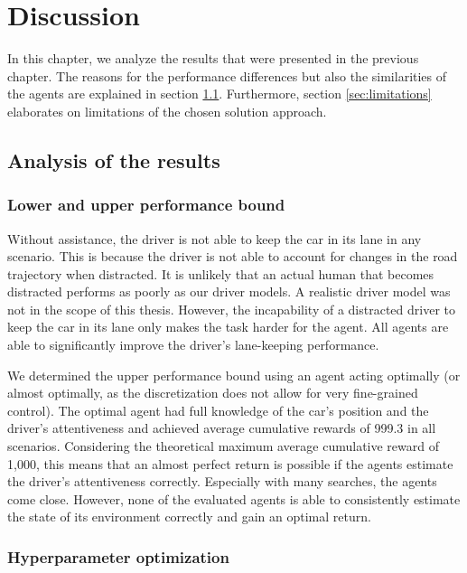 \chapter{Discussion}
\label{ch:discussion}

In this chapter, we analyze the results that were presented in the previous chapter. The reasons for the performance differences but also the similarities of the agents are explained in section \ref{sec:discussion_analysis}. Furthermore, section \ref{sec:limitations} elaborates on limitations of the chosen solution approach.

\section{Analysis of the results}
\label{sec:discussion_analysis}

\subsection{Lower and upper performance bound}

Without assistance, the driver is not able to keep the car in its lane in any scenario. This is because the driver is not able to account for changes in the road trajectory when distracted. It is unlikely that an actual human that becomes distracted performs as poorly as our driver models. A realistic driver model was not in the scope of this thesis. However, the incapability of a distracted driver to keep the car in its lane only makes the task harder for the agent. All agents are able to significantly improve the driver's lane-keeping performance.

We determined the upper performance bound using an agent acting optimally (or almost optimally, as the discretization does not allow for very fine-grained control). The optimal agent had full knowledge of the car's position and the driver's attentiveness and achieved average cumulative rewards of 999.3 in all scenarios. Considering the theoretical maximum average cumulative reward of 1,000, this means that an almost perfect return is possible if the agents estimate the driver's attentiveness correctly. Especially with many searches, the agents come close. However, none of the evaluated agents is able to consistently estimate the state of its environment correctly and gain an optimal return.

\subsection{Hyperparameter optimization}


